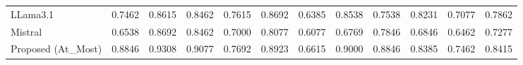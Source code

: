\begin{table}[h!]
{\begin{tabular}{lcccccccccc||c}
            LLama3.1                           & 0.7462                                                  & 0.8615                                                  & 0.8462                                                  & 0.7615                                                            & 0.8692                                                  & 0.6385                                                    & 0.8538                                                            & 0.7538                                                  & 0.8231                                 & 0.7077                                   & 0.7862 \\
            Mistral                            & 0.6538                                                  & 0.8692                                                  & 0.8462                                                  & 0.7000                                                            & 0.8077                                                  & 0.6077                                                    & 0.6769                                                            & 0.7846                                                  & 0.6846                                 & 0.6462                                   & 0.7277 \\
            Proposed (At\_Most)                & 0.8846                                                  & 0.9308                                                  & 0.9077                                                  & 0.7692                                                            & 0.8923                                                  & 0.6615                                                    & 0.9000                                                            & 0.8846                                                  & 0.8385                                 & 0.7462                                   & 0.8415 \\
            \bottomrule
        \end{tabular}}
    \label{tab:evaluation_results-full-category}
\end{table}

